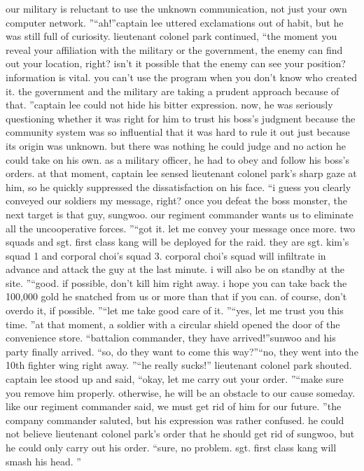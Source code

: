  our military is reluctant to use the unknown communication, not just your own computer network.
”“ah!”captain lee uttered exclamations out of habit, but he was still full of curiosity.
lieutenant colonel park continued, “the moment you reveal your affiliation with the military or the government, the enemy can find out your location, right? isn’t it possible that the enemy can see your position? information is vital.
 you can’t use the program when you don’t know who created it.
 the government and the military are taking a prudent approach because of that.
”captain lee could not hide his bitter expression.
 now, he was seriously questioning whether it was right for him to trust his boss’s judgment because the community system was so influential that it was hard to rule it out just because its origin was unknown.
but there was nothing he could judge and no action he could take on his own.
 as a military officer, he had to obey and follow his boss’s orders.
at that moment, captain lee sensed lieutenant colonel park’s sharp gaze at him, so he quickly suppressed the dissatisfaction on his face.
“i guess you clearly conveyed our soldiers my message, right? once you defeat the boss monster, the next target is that guy, sungwoo.
 our regiment commander wants us to eliminate all the uncooperative forces.
”“got it.
 let me convey your message once more.
 two squads and sgt.
 first class kang will be deployed for the raid.
 they are sgt.
 kim’s squad 1 and corporal choi’s squad 3.
 corporal choi’s squad will infiltrate in advance and attack the guy at the last minute.
 i will also be on standby at the site.
”“good.
 if possible, don’t kill him right away.
 i hope you can take back the 100,000 gold he snatched from us or more than that if you can.
 of course, don’t overdo it, if possible.
”“let me take good care of it.
”“yes, let me trust you this time.
”at that moment, a soldier with a circular shield opened the door of the convenience store.
“battalion commander, they have arrived!”sunwoo and his party finally arrived.
“so, do they want to come this way?”“no, they went into the 10th fighter wing right away.
”“he really sucks!” lieutenant colonel park shouted.
captain lee stood up and said, “okay, let me carry out your order.
”“make sure you remove him properly.
 otherwise, he will be an obstacle to our cause someday.
 like our regiment commander said, we must get rid of him for our future.
”the company commander saluted, but his expression was rather confused.
 he could not believe lieutenant colonel park’s order that he should get rid of sungwoo, but he could only carry out his order.
“sure, no problem.
 sgt.
 first class kang will smash his head.
”

